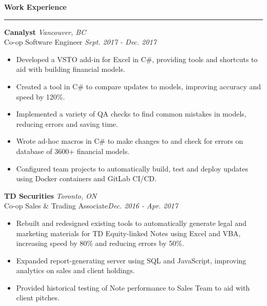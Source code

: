 \documentclass{letter}
\begin{document}
	\begin{flushleft}
		{\Large \textbf{Work Experience}}
		\rule[5pt]{\textwidth}{0.4pt}
		\vspace{-15pt}
		{\large\textbf{Canalyst}}  \hfill \textit{Vancouver, BC} \\
		\vspace{15pt}
		Co-op Software Engineer \hfill \textit{Sept. 2017 - Dec. 2017}
		\vspace{-9pt}
		\begin{itemize}
			\item Developed a VSTO add-in for Excel in C\#, providing tools and shortcuts to aid with building financial models.\vspace{-3pt}
			\item Created a tool in C\# to compare updates to models, improving accuracy and speed by 120\%.\vspace{-3pt}
			\item Implemented a variety of QA checks to find common mistakes in models, reducing errors and saving time. \vspace{-3pt}
			\item Wrote ad-hoc macros in C\# to make changes to and check for errors on database of 3600+ financial models. \vspace{-3pt}
			\item Configured team projects to automatically build, test and deploy updates using Docker containers and GitLab CI/CD.
		\end{itemize}

		{\large\textbf{TD Securities}}  \hfill \textit{Toronto, ON} \\
		\vspace{1pt}
		Co-op Sales \& Trading Associate\hfill \textit{Dec. 2016 - Apr. 2017}
		\vspace{-9pt}
		\begin{itemize}
			\item Rebuilt and redesigned existing tools to automatically generate legal and marketing materials for TD Equity-linked Notes using Excel and VBA, increasing speed by 80\% and reducing errors by 50\%. \vspace{-3pt}
			\item Expanded report-generating server using SQL and JavaScript, improving analytics on sales and client holdings. \vspace{-3pt}
			\item Provided historical testing of Note performance to Sales Team to aid with client pitches.
		\end{itemize}
	

\end{flushleft}
\end{document}
